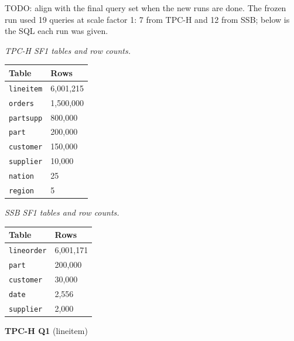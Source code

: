 \documentclass[
]{article}
\newcounter{none} %
\begin{document}
TODO: align with the final query set when the new runs are done. The
frozen run used 19 queries at scale factor 1: 7 from TPC-H and 12 from
SSB; below is the SQL each run was given.

\emph{TPC-H SF1 tables and row counts.}

{\def\LTcaptype{none} %
\begin{longtable}[]{@{}ll@{}}
\toprule\noalign{}
Table & Rows \\
\midrule\noalign{}
\endhead
\bottomrule\noalign{}
\endlastfoot
\texttt{lineitem} & 6,001,215 \\
\texttt{orders} & 1,500,000 \\
\texttt{partsupp} & 800,000 \\
\texttt{part} & 200,000 \\
\texttt{customer} & 150,000 \\
\texttt{supplier} & 10,000 \\
\texttt{nation} & 25 \\
\texttt{region} & 5 \\
\end{longtable}
}

\emph{SSB SF1 tables and row counts.}

{\def\LTcaptype{none} %
\begin{longtable}[]{@{}ll@{}}
\toprule\noalign{}
Table & Rows \\
\midrule\noalign{}
\endhead
\bottomrule\noalign{}
\endlastfoot
\texttt{lineorder} & 6,001,171 \\
\texttt{part} & 200,000 \\
\texttt{customer} & 30,000 \\
\texttt{date} & 2,556 \\
\texttt{supplier} & 2,000 \\
\end{longtable}
}

\textbf{TPC-H Q1} (lineitem)
\end{document}
